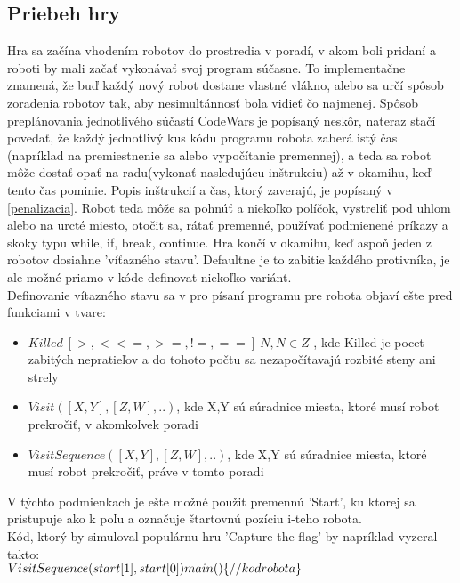 \subsection {Priebeh hry}
Hra sa začína vhodením robotov do prostredia v poradí, v akom boli pridaní a roboti by mali začať vykonávať svoj program súčasne. To implementačne znamená, že buď každý nový robot dostane vlastné vlákno, alebo sa určí spôsob zoradenia robotov tak, aby nesimultánnosť bola vidieť čo najmenej. Spôsob preplánovania jednotlivého súčastí CodeWars je popísaný neskôr, nateraz stačí povedať, že každý jednotlivý kus kódu programu robota zaberá istý čas (napríklad na premiestnenie sa alebo vypočítanie premennej), a teda sa robot môže dostať opať na radu(vykonať nasledujúcu inštrukciu) až v okamihu, keď tento čas pominie. Popis inštrukcií a čas, ktorý zaverajú, je popísaný v \ref{penalizacia}. Robot teda môže sa pohnúť a niekoľko políčok, vystreliť pod uhlom alebo na urcté miesto, otočit sa, rátať premenné, používať podmienené príkazy a skoky typu while, if, break, continue. Hra končí v okamihu, keď aspoň jeden z robotov dosiahne 'víťazného stavu'. Defaultne je to zabitie každého protivníka, je ale možné priamo v kóde definovat niekoľko variánt.\\
Definovanie vítazného stavu sa v pro písaní programu pre robota objaví ešte pred funkciami v tvare:
\begin{itemize}
\item $Killed\ [>, < <=, >=, !=, ==]\ N, N \in Z$ , kde Killed je pocet zabitých nepratieľov a do tohoto počtu sa nezapočítavajú rozbité steny ani strely
\item $Visit([X,Y], [Z,W],..)$, kde X,Y sú súradnice miesta, ktoré musí robot prekročiť, v akomkoľvek poradi
\item $VisitSequence([X,Y], [Z,W],..)$, kde X,Y sú súradnice miesta, ktoré musí robot prekročiť, práve v tomto poradi
\end{itemize}
V týchto podmienkach je ešte možné použit premennú 'Start', ku ktorej sa pristupuje ako k poľu a označuje štartovnú pozíciu i-teho robota.\\
Kód, ktorý by simuloval populárnu hru 'Capture the flag' by napríklad vyzeral takto:\\
$VisitSequence(start[1],start[0]) \\ main()\\\{\\//kod robota\\\}\\$
